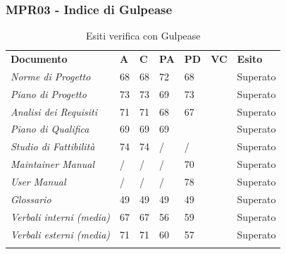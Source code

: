 \subsubsection{MPR03 - Indice di Gulpease}
\begin{center}
    \centering
    \renewcommand{\arraystretch}{1.8}
    \label{tab:IndiciGulpease}
    \begin{longtable}[!h]{p{100px} p{50px} p{50px} p{50px} p{50px} p{50px} p{50px}}
        \caption{Esiti verifica con Gulpease}                                                                                        \\
        \rowcolor{logo!70}   \textbf{Documento} & \textbf{A} & \textbf{C} & \textbf{PA} & \textbf{PD} & \textbf{VC} & \textbf{Esito} \\
        \textit{Norme di Progetto}              & 68         & 68         & 72          & 68          &             & Superato       \\
        \textit{Piano di Progetto}              & 73         & 73         & 69          & 73          &             & Superato       \\
        \textit{Analisi dei Requisiti}          & 71         & 71         & 68          & 67          &             & Superato       \\
        \textit{Piano di Qualifica}             & 69         & 69         & 69          &             &             & Superato       \\
        \textit{Studio di Fattibilità}          & 74         & 74         & /           & /           &             & Superato       \\
        \textit{Maintainer Manual}              & /          & /          & /           & 70          &             & Superato       \\
        \textit{User Manual}                    & /          & /          & /           & 78          &             & Superato       \\
        \textit{Glossario}                      & 49         & 49         & 49          & 49          &             & Superato       \\
        \textit{Verbali interni (media)}        & 67         & 67         & 56          & 59          &             & Superato       \\
        \textit{Verbali esterni (media)}        & 71         & 71         & 60          & 57          &             & Superato       \\
        \rowcolor{white}
    \end{longtable}
\end{center}
